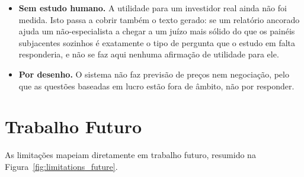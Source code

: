 \begin{itemize}
        O exercício adversário que produziu a guarda atual foi também \emph{incompleto}, e a maneira
        como o foi merece registo. Encomendaram-se seis perspetivas de ataque; duas completaram,
        produzindo $114$ tentativas das quais $21$ foram reproduzidas, e as restantes terminaram por
        limite de gasto da conta --- incluindo todas as etapas de verificação independente. O
        exercício devolveu assim um veredicto nominalmente limpo que era, de facto, a \emph{ausência}
        de verificação, modo de falha que este projeto já encontrou repetidas vezes. Os achados sobre
        os quais se atuou foram confirmados à mão contra o código em execução, e o corpus retém-nos
        como regressões; mas a guarda não enfrentou quatro das seis perspetivas, e a afirmação
        honesta é que a sua força medida é um limite inferior estabelecido contra um adversário
        interrompido.
  \item \textbf{Sem estudo humano.} A utilidade para um investidor real ainda não foi medida. Isto
        passa a cobrir também o texto gerado: se um relatório ancorado ajuda um não-especialista a
        chegar a um juízo mais sólido do que os painéis subjacentes sozinhos é exatamente o tipo de
        pergunta que o estudo em falta responderia, e não se faz aqui nenhuma afirmação de utilidade
        para ele.
  \item \textbf{Por desenho.} O sistema não faz previsão de preços nem negociação, pelo que as
        questões baseadas em lucro estão fora de âmbito, não por responder.
\end{itemize}

\section{Trabalho Futuro}
\label{sec:concl_future}

As limitações mapeiam diretamente em trabalho futuro, resumido na
Figura~\ref{fig:limitations_future}.

